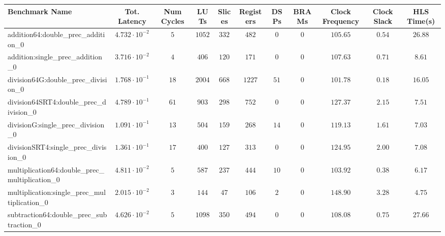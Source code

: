 \begin{tabular}{|l|c|c|c|c|c|c|c|c|c|c|}
\hline
Benchmark Name                                   & Tot. Latency            & Num Cycles & LUTs     & Slices   & Registers & DSPs   & BRAMs & Clock Frequency & Clock Slack & HLS Time(s) \\
\hline
addition64:double\_prec\_addition\_0             & $ 4.732 \cdot 10^{-2} $ & $ 5      $ & $ 1052 $ & $ 332  $ & $ 482   $ & $ 0  $ & $ 0 $ & $ 105.65      $ & $ 0.54    $ & $ 26.88   $ \\
addition:single\_prec\_addition\_0               & $ 3.716 \cdot 10^{-2} $ & $ 4      $ & $ 406  $ & $ 120  $ & $ 171   $ & $ 0  $ & $ 0 $ & $ 107.63      $ & $ 0.71    $ & $ 8.61    $ \\
division64G:double\_prec\_division\_0            & $ 1.768 \cdot 10^{-1} $ & $ 18     $ & $ 2004 $ & $ 668  $ & $ 1227  $ & $ 51 $ & $ 0 $ & $ 101.78      $ & $ 0.18    $ & $ 16.05   $ \\
division64SRT4:double\_prec\_division\_0         & $ 4.789 \cdot 10^{-1} $ & $ 61     $ & $ 903  $ & $ 298  $ & $ 752   $ & $ 0  $ & $ 0 $ & $ 127.37      $ & $ 2.15    $ & $ 7.51    $ \\
divisionG:single\_prec\_division\_0              & $ 1.091 \cdot 10^{-1} $ & $ 13     $ & $ 504  $ & $ 159  $ & $ 268   $ & $ 14 $ & $ 0 $ & $ 119.13      $ & $ 1.61    $ & $ 7.03    $ \\
divisionSRT4:single\_prec\_division\_0           & $ 1.361 \cdot 10^{-1} $ & $ 17     $ & $ 400  $ & $ 127  $ & $ 313   $ & $ 0  $ & $ 0 $ & $ 124.95      $ & $ 2.00    $ & $ 7.08    $ \\
multiplication64:double\_prec\_multiplication\_0 & $ 4.811 \cdot 10^{-2} $ & $ 5      $ & $ 587  $ & $ 237  $ & $ 444   $ & $ 10 $ & $ 0 $ & $ 103.92      $ & $ 0.38    $ & $ 6.17    $ \\
multiplication:single\_prec\_multiplication\_0   & $ 2.015 \cdot 10^{-2} $ & $ 3      $ & $ 144  $ & $ 47   $ & $ 106   $ & $ 2  $ & $ 0 $ & $ 148.90      $ & $ 3.28    $ & $ 4.75    $ \\
subtraction64:double\_prec\_subtraction\_0       & $ 4.626 \cdot 10^{-2} $ & $ 5      $ & $ 1098 $ & $ 350  $ & $ 494   $ & $ 0  $ & $ 0 $ & $ 108.08      $ & $ 0.75    $ & $ 27.66   $ \\

\end{tabular}
